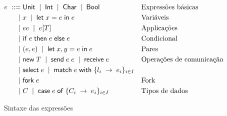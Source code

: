 \begin{figure}[h!]
  \begin{align*}
    e \; ::= \; & \mathsf{Unit} \;\mid\; \mathsf{Int} \;\mid\; \mathsf{Char} \;\mid\; \mathsf{Bool} && \text{Expressões básicas}\\
    \;\mid\; & x \;\mid\; \mathsf{let} \; x = e \; \mathsf{in} \; e && \text{Variáveis}\\
    \;\mid\; & ee \;\mid\; e[T] && \text{Applicações}\\
    \;\mid\; & \mathsf{if}\;e\;\mathsf{then}\;e\;\mathsf{else} \; e && \text{Condicional}\\
    \;\mid\; & (e,e) \;\mid\; \mathsf{let}\;x, y = e\;\mathsf{in}\;e && \text{Pares}\\
    \;\mid\; & \mathsf{new}\;T \;\mid\; \mathsf{send}\;e\; e \;\mid\; \mathsf{receive}\;e && \text{Operações de comunicação}\\
    \;\mid\; & \mathsf{select}\;e \;\mid\; \mathsf{match}\;e\;\mathsf{with}\;\{l_i\;\to\;e_i\}_{i\in I} \\
    \;\mid\; & \mathsf{fork}\;e  && \text{Fork}\\
    \;\mid\; & C \;\mid\; \mathsf{case}\;e\;\mathsf{of}\;\{C_i\;\to\;e_i\}_{i\in I} && \text{Tipos de dados}\\
  \end{align*}
  \hrulefill
  \caption{Sintaxe das expressões}
  \label{fig:expressions}
\end{figure}


